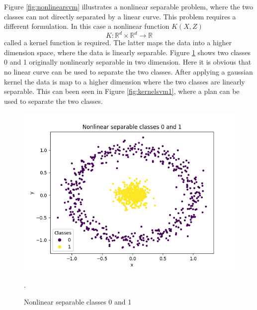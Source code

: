 \documentclass[../Main/thesis.tex]{subfiles}
\begin{document}
\justify
Figure \ref{fig:nonlinearsvm} illustrates a nonlinear separable problem, where the two classes can not directly separated by a linear curve. This problem requires a different formulation. In this case a nonlinear function $K(X,Z)$
\begin{equation}
K: \mathbb{R}^{d}\times \mathbb{R}^{d} \rightarrow \mathbb{R}
\end{equation}
called a kernel function is required. The latter maps the data into a higher dimension space, where the data is linearly separable. Figure \ref{fig:kernelsvm} shows two classes 0 and 1 originally nonlinearly separable in two dimension.  Here it is obvious that no linear curve can be used to separate the two classes. After applying a gaussian kernel the data is map to a higher dimension where the two classes are linearly separable. This can been seen in Figure \ref{fig:kernelsvm1}, where a plan can be used to separate the two classes.
\begin{figure}[H] %
   \centering
   \includegraphics[width=6in]{../fig/nonlinearseparable.png} 
   \caption{Nonlinear separable classes 0 and 1}.
   \label{fig:kernelsvm}
\end{figure}
\end{document}
